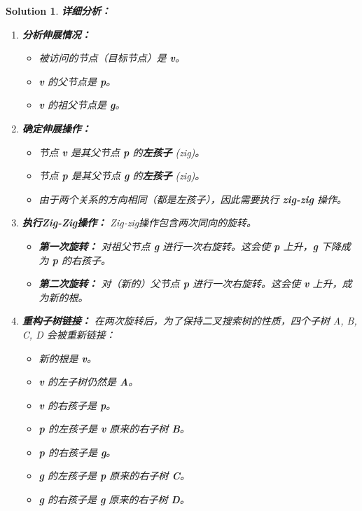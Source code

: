\documentclass[UTF8]{report}
\newtheorem{solution}{Solution}
\theoremstyle{MyLineTheoremStyle} %
\theoremstyle{MyBlockTheoremStyle} %
\theoremstyle{MySubsubsectionStyle} %
\begin{document}
\begin{solution}
\textbf{详细分析：}

\begin{enumerate}
    \item \textbf{分析伸展情况：}
    \begin{itemize}
        \item 被访问的节点（目标节点）是 \textbf{v}。
        \item \textbf{v} 的父节点是 \textbf{p}。
        \item \textbf{v} 的祖父节点是 \textbf{g}。
    \end{itemize}

    \item \textbf{确定伸展操作：}
    \begin{itemize}
        \item 节点 \textbf{v} 是其父节点 \textbf{p} 的\textbf{左孩子} (zig)。
        \item 节点 \textbf{p} 是其父节点 \textbf{g} 的\textbf{左孩子} (zig)。
        \item 由于两个关系的方向相同（都是左孩子），因此需要执行 \textbf{zig-zig} 操作。
    \end{itemize}

    \item \textbf{执行Zig-Zig操作：}
    Zig-zig操作包含两次同向的旋转。
    \begin{itemize}
        \item \textbf{第一次旋转：} 对祖父节点 \textbf{g} 进行一次右旋转。这会使 \textbf{p} 上升，\textbf{g} 下降成为 \textbf{p} 的右孩子。
        \item \textbf{第二次旋转：} 对（新的）父节点 \textbf{p} 进行一次右旋转。这会使 \textbf{v} 上升，成为新的根。
    \end{itemize}
    
    \item \textbf{重构子树链接：}
    在两次旋转后，为了保持二叉搜索树的性质，四个子树 A, B, C, D 会被重新链接：
    \begin{itemize}
        \item 新的根是 \textbf{v}。
        \item \textbf{v} 的左子树仍然是 \textbf{A}。
        \item \textbf{v} 的右孩子是 \textbf{p}。
        \item \textbf{p} 的左孩子是 \textbf{v} 原来的右子树 \textbf{B}。
        \item \textbf{p} 的右孩子是 \textbf{g}。
        \item \textbf{g} 的左孩子是 \textbf{p} 原来的右子树 \textbf{C}。
        \item \textbf{g} 的右孩子是 \textbf{g} 原来的右子树 \textbf{D}。
    \end{itemize}
\end{enumerate}


\end{solution}
\end{document}
